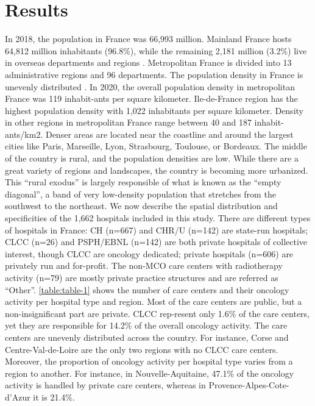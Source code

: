\section{Results}

In 2018, the population in France was 66,993 million. Mainland France hosts 64,812 million inhabitants (96.8\%), while the remaining 2,181 million (3.2\%) live in overseas departments and regions . Metropolitan France is divided into 13 administrative regions and 96 departments. The population density in France is unevenly distributed . In 2020, the overall population density in metropolitan France was 119 inhabit-ants per square kilometer. Ile-de-France region has the highest population density with 1,022 inhabitants per square kilometer. Density in other regions in metropolitan France range between 40 and 187 inhabit-ants/km2. Denser areas are located near the coastline and around the largest cities like Paris, Marseille, Lyon, Strasbourg, Toulouse, or Bordeaux. The middle of the country is rural, and the population densities are low. While there are a great variety of regions and landscapes, the country is becoming more urbanized. This ``rural exodus'' is largely responsible of what is known as the ``empty diagonal'', a band of very low-density population that stretches from the southwest to the northeast.
We now describe the spatial distribution and specificities of the 1,662 hospitals included in this study. There are different types of hospitals in France: CH  (n=667) and CHR/U  (n=142) are state-run hospitals; CLCC  (n=26) and PSPH/EBNL  (n=142) are both private hospitals of collective interest, though CLCC are oncology dedicated; private hospitals (n=606) are privately run and for-profit. The non-MCO care centers with radiotherapy activity (n=79) are mostly private practice structures and are referred as “Other”. \cref{table:table-1} shows the number of care centers and their oncology activity per hospital type and region. Most of the care centers are public, but a non-insignificant part are private. CLCC rep-resent only 1.6\% of the care centers, yet they are responsible for 14.2\% of the overall oncology activity. The care centers are unevenly distributed across the country. For instance, Corse and Centre-Val-de-Loire are the only two regions with no CLCC care centers. Moreover, the proportion of oncology activity per hospital type varies from a region to another. For instance, in Nouvelle-Aquitaine, 47.1\% of the oncology activity is handled by private care centers, whereas in Provence-Alpes-Cote-d'Azur it is 21.4\%.

